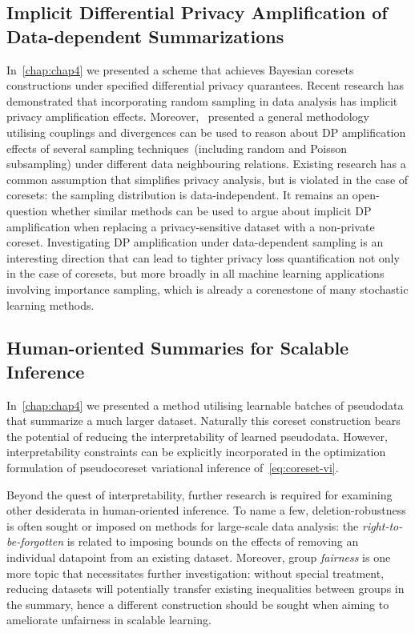 \subsection{Implicit Differential Privacy Amplification of Data-dependent Summarizations}
\label{subsec:implicit-dp-amplification}

In~\cref{chap:chap4} we presented a scheme that achieves  Bayesian coresets constructions under specified differential privacy quarantees. Recent research has demonstrated that incorporating random sampling in data analysis has implicit privacy amplification effects. Moreover,~\citep{balle18} presented a general methodology utilising couplings and divergences can be used to reason about DP amplification effects of several sampling techniques~(including random and Poisson subsampling) under different data neighbouring relations. Existing research has a common assumption that simplifies privacy analysis, but is violated in the case of coresets: the sampling distribution is data-independent. It remains an open-question whether similar methods can be used to argue about implicit DP amplification when replacing a privacy-sensitive dataset with a non-private coreset. Investigating DP amplification under data-dependent sampling is an interesting direction that can lead to tighter privacy loss quantification not only in the case of coresets, but more broadly in all machine learning applications involving importance sampling, which is already a corenestone of many stochastic learning methods. 


\subsection{Human-oriented Summaries for Scalable Inference}
\label{subsec:human-oriented-pseudodata}

In~\cref{chap:chap4} we presented a method utilising learnable batches of pseudodata that summarize a much larger dataset. Naturally this coreset construction bears the potential of reducing the interpretability of learned pseudodata. However, interpretability constraints can be explicitly incorporated in the optimization formulation of pseudocoreset variational inference of~\cref{eq:coreset-vi}.

Beyond the quest of interpretability, further research is required for examining other desiderata in human-oriented inference. To name a few, deletion-robustness is often sought or imposed on methods for large-scale data analysis: the \emph{right-to-be-forgotten} is related to imposing bounds on  the effects of removing an individual datapoint from an existing dataset. Moreover, group \emph{fairness} is one more topic that necessitates further investigation: without special treatment, reducing datasets will potentially transfer existing inequalities between groups in the summary, hence a different construction should be sought when aiming to ameliorate unfairness in scalable learning.  